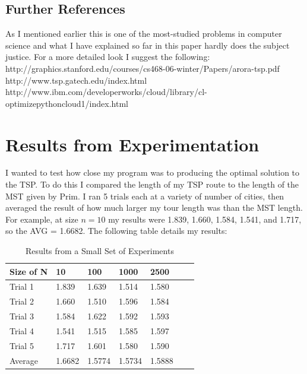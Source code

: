 \documentclass[paper=a4, fontsize=11pt]{scrartcl} %
\numberwithin{equation}{section} %
\numberwithin{figure}{section} %
\numberwithin{table}{section} %
\begin{document}

\subsection{Further References}
As I mentioned earlier this is one of the most-studied problems in computer science and what I have explained so far in this paper hardly does the subject justice. For a more detailed look I suggest the following: \\
http://graphics.stanford.edu/courses/cs468-06-winter/Papers/arora-tsp.pdf \\
http://www.tsp.gatech.edu/index.html \\
http://www.ibm.com/developerworks/cloud/library/cl-optimizepythoncloud1/index.html 


\section{Results from Experimentation}
I wanted to test how close my program was to producing the optimal solution to the TSP. To do this I compared the length of my TSP route to the length of the MST given by Prim. I ran 5 trials each at a variety of number of cities, then averaged the result of how much larger my tour length was than the MST length. For example, at size $n = 10$ my results were 1.839, 1.660, 1.584, 1.541, and 1.717, so the AVG = 1.6682. The following table details my results:

\begin{table}[h]
\caption{Results from a Small Set of Experiments}
\centering
    \begin{tabular}{|l|l|l|l|l|l|l|}
        \hline
        Size of N    & 10 & 100 & 1000 & 2500    \\ \hline
        Trial 1    & 1.839 & 1.639 & 1.514 & 1.580    \\ \hline
        Trial 2    & 1.660 & 1.510 & 1.596 & 1.584    \\ \hline
        Trial 3    & 1.584 & 1.622 & 1.592 & 1.593    \\ \hline
        Trial 4    & 1.541 & 1.515 & 1.585 & 1.597    \\ \hline
        Trial 5    & 1.717 & 1.601 & 1.580 & 1.590    \\ \hline \hline
        Average & 1.6682 & 1.5774 & 1.5734 & 1.5888 \\
        \hline									
    \end{tabular}
\end{table}
\end{document}
